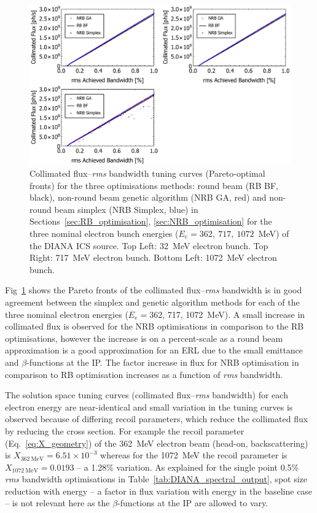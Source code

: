\documentclass[../main.tex]{subfiles}
\begin{document}
\begin{figure}[!h]
\centering
\includegraphics[width=\textwidth]{Figures/DIANA_Inverse_Compton_Source_Design/DIANAFBW.pdf}
\caption{Collimated flux--\textit{rms} bandwidth tuning curves (Pareto-optimal fronts) for the three optimisations methods: round beam (RB BF, black), non-round beam genetic algorithm (NRB GA, red) and non-round beam simplex (NRB Simplex, blue) in Sections~\ref{sec:RB_optimisation}, \ref{sec:NRB_optimisation} for the three nominal electron bunch energies ($E_{e}=362,~717,~1072$~\si{\mega\electronvolt}) of the DIANA ICS source. Top Left: 32~\si{\mega\electronvolt} electron bunch. Top Right: 717~\si{\mega\electronvolt} electron bunch. Bottom Left: 1072~\si{\mega\electronvolt} electron bunch.}
\label{fig:DIANA_FBW}
\end{figure}

Fig~\ref{fig:DIANA_FBW} shows the Pareto fronts of the collimated flux--\textit{rms} bandwidth is in good agreement between the simplex and genetic algorithm methods for each of the three nominal electron energies ($E_{e}= $362, 717, 1072~\si{\mega\electronvolt}). A small increase in collimated flux is observed for the NRB optimisations in comparison to the RB optimisations, however the increase is on a percent-scale as a round beam approximation is a good approximation for an ERL due to the small emittance and $\beta$-functions at the IP. The factor increase in flux for NRB optimisation in comparison to RB optimisation increases as a function of \textit{rms} bandwidth. 

The solution space tuning curves (collimated flux--\textit{rms} bandwidth) for each electron energy are near-identical and small variation in the tuning curves is observed because of differing recoil parameters, which reduce the collimated flux by reducing the cross section. For example the recoil parameter (Eq.~\ref{eq:X_geometry}) of the 362~\si{\mega\electronvolt} electron beam (head-on, backscattering) is $X_{362~\si{\mega\electronvolt}}=6.51\times 10^{-3}$ whereas for the 1072~\si{\mega\electronvolt} the recoil parameter is $X_{1072~\si{\mega\electronvolt}}=0.0193$ -- a 1.28\% variation. As explained for the single point 0.5\% \textit{rms} bandwidth optimisations in Table~\ref{tab:DIANA_spectral_output}, spot size reduction with energy -- a factor in flux variation with energy in the baseline case -- is not relevant here as the $\beta$-functions at the IP are allowed to vary.
\end{document}
